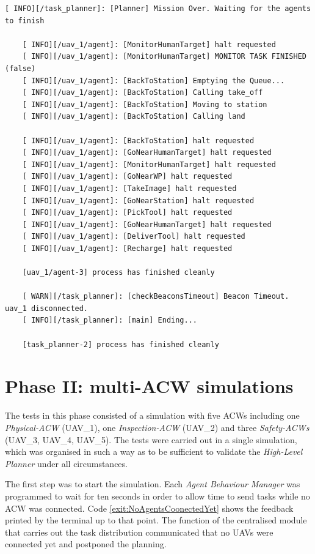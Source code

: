 \begin{lstlisting}[caption={Feedback messages printed after mission over signal}, breaklines=true, label=exit:event_MissionOver]
    [ INFO][/task_planner]: [Planner] Mission Over. Waiting for the agents to finish

    [ INFO][/uav_1/agent]: [MonitorHumanTarget] halt requested
    [ INFO][/uav_1/agent]: [MonitorHumanTarget] MONITOR TASK FINISHED (false)
    [ INFO][/uav_1/agent]: [BackToStation] Emptying the Queue...
    [ INFO][/uav_1/agent]: [BackToStation] Calling take_off
    [ INFO][/uav_1/agent]: [BackToStation] Moving to station
    [ INFO][/uav_1/agent]: [BackToStation] Calling land

    [ INFO][/uav_1/agent]: [BackToStation] halt requested
    [ INFO][/uav_1/agent]: [GoNearHumanTarget] halt requested
    [ INFO][/uav_1/agent]: [MonitorHumanTarget] halt requested
    [ INFO][/uav_1/agent]: [GoNearWP] halt requested
    [ INFO][/uav_1/agent]: [TakeImage] halt requested
    [ INFO][/uav_1/agent]: [GoNearStation] halt requested
    [ INFO][/uav_1/agent]: [PickTool] halt requested
    [ INFO][/uav_1/agent]: [GoNearHumanTarget] halt requested
    [ INFO][/uav_1/agent]: [DeliverTool] halt requested
    [ INFO][/uav_1/agent]: [Recharge] halt requested

    [uav_1/agent-3] process has finished cleanly

    [ WARN][/task_planner]: [checkBeaconsTimeout] Beacon Timeout. uav_1 disconnected.
    [ INFO][/task_planner]: [main] Ending...
    
    [task_planner-2] process has finished cleanly
\end{lstlisting}

\section{Phase II: multi-ACW simulations}
\label{sec:phaseII}
The tests in this phase consisted of a simulation with five \glspl{ACW} including one \emph{Physical-ACW} (UAV\_1), one \emph{Inspection-ACW} (UAV\_2) and three \emph{Safety-ACWs} (UAV\_3, UAV\_4, UAV\_5). The tests were carried out in a single simulation, which was organised in such a way as to be sufficient to validate the \emph{High-Level Planner} under all circumstances.

The first step was to start the simulation. Each \emph{Agent Behaviour Manager} was programmed to wait for ten seconds in order to allow time to send tasks while no \gls{ACW} was connected. Code \ref{exit:NoAgentsCoonectedYet} shows the feedback printed by the terminal up to that point. The function of the centralised module that carries out the task distribution communicated that no \glspl{UAV} were connected yet and postponed the planning.

